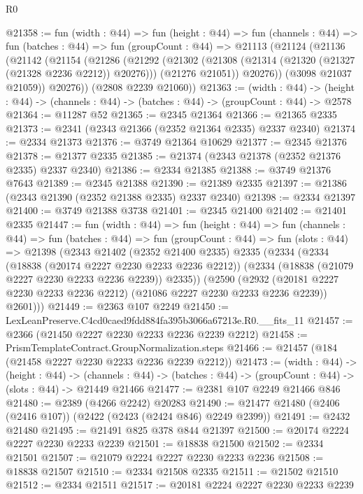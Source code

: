 \begin{lexlean}{R0}
\begin{coremodule}
@21358 := fun (width : @44) =>
  fun (height : @44) =>
  fun (channels : @44) =>
  fun (batches : @44) =>
  fun (groupCount : @44) =>
  @21113
    (@21124
      (@21136
        (@21142
          (@21154
            (@21286
              (@21292
                (@21302
                  (@21308 (@21314 (@21320 (@21327 (@21328 @2236 @2212)) @20276)))
                  (@21276 @21051))
                @20276))
            (@3098 @21037 @21059))
          @20276))
      (@2808 @2239 @21060))
@21363 := (width : @44) ->
  (height : @44) -> (channels : @44) -> (batches : @44) -> (groupCount : @44) -> @2578
@21364 := @11287 @52
@21365 := @2345 @21364
@21366 := @21365 @2335
@21373 := @2341 (@2343 @21366 (@2352 @21364 @2335) @2337 @2340)
@21374 := @2334 @21373
@21376 := @3749 @21364 @10629
@21377 := @2345 @21376
@21378 := @21377 @2335
@21385 := @21374 (@2343 @21378 (@2352 @21376 @2335) @2337 @2340)
@21386 := @2334 @21385
@21388 := @3749 @21376 @7643
@21389 := @2345 @21388
@21390 := @21389 @2335
@21397 := @21386 (@2343 @21390 (@2352 @21388 @2335) @2337 @2340)
@21398 := @2334 @21397
@21400 := @3749 @21388 @3738
@21401 := @2345 @21400
@21402 := @21401 @2335
@21447 := fun (width : @44) =>
  fun (height : @44) =>
  fun (channels : @44) =>
  fun (batches : @44) =>
  fun (groupCount : @44) =>
  fun (slots : @44) =>
  @21398
    (@2343
      @21402
      (@2352 @21400 @2335)
      @2335
      (@2334
        (@2334
          (@18838 (@20174 @2227 @2230 @2233 @2236 @2212))
          (@2334 (@18838 (@21079 @2227 @2230 @2233 @2236 @2239)) @2335))
        (@2590
          (@2932 (@20181 @2227 @2230 @2233 @2236 @2212) (@21086 @2227 @2230 @2233 @2236 @2239))
          @2601)))
@21449 := @2363 @107 @2249
@21450 := LexLeanPreserve.C4cd0caed9fdd884fa395b3066a67213e.R0.__fits_11
@21457 := @2366 (@21450 @2227 @2230 @2233 @2236 @2239 @2212)
@21458 := PrismTemplateContract.GroupNormalization.steps
@21466 := @21457 (@184 (@21458 @2227 @2230 @2233 @2236 @2239 @2212))
@21473 := (width : @44) ->
  (height : @44) ->
  (channels : @44) -> (batches : @44) -> (groupCount : @44) -> (slots : @44) -> @21449 @21466
@21477 := @2381 @107 @2249 @21466 @846
@21480 := @2389 (@4266 @2242) @20283
@21490 := @21477 @21480 (@2406 (@2416 @107)) (@2422 (@2423 (@2424 @846) @2249 @2399))
@21491 := @2432 @21480
@21495 := @21491 @825 @378 @844 @21397
@21500 := @20174 @2224 @2227 @2230 @2233 @2239
@21501 := @18838 @21500
@21502 := @2334 @21501
@21507 := @21079 @2224 @2227 @2230 @2233 @2236
@21508 := @18838 @21507
@21510 := @2334 @21508 @2335
@21511 := @21502 @21510
@21512 := @2334 @21511
@21517 := @20181 @2224 @2227 @2230 @2233 @2239

\end{coremodule}
\end{lexlean}
